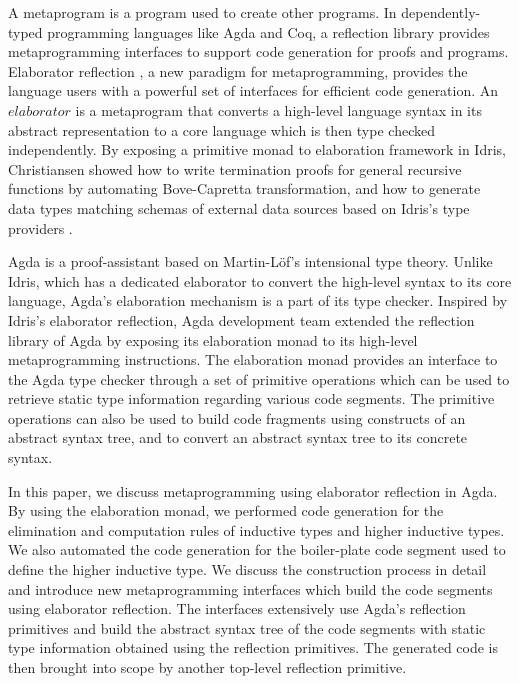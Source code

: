 \documentclass[sigplan,10pt]{acmart}
\begin{document}
A metaprogram is a program used to create other programs. In dependently-typed programming languages like Agda and Coq, a reflection library provides metaprogramming interfaces to support code generation for proofs and programs. Elaborator reflection \cite{David-2016}, a new paradigm for metaprogramming, provides the language users with a powerful set of interfaces for efficient code generation. An $elaborator$ is a metaprogram that converts a high-level language syntax in its abstract representation to a core language which is then type checked independently. By exposing a primitive monad to elaboration framework in Idris, Christiansen \cite{David-2016} showed how to write termination proofs for general recursive functions by automating Bove-Capretta \cite{Bove-2005} transformation, and how to generate data types matching schemas of external data sources based on Idris’s type providers \cite{David-2013}.

Agda is a proof-assistant based on Martin-Löf’s intensional type theory. Unlike Idris, which has a dedicated elaborator to convert the high-level syntax to its core language, Agda’s elaboration mechanism is a part of its type checker. Inspired by Idris’s elaborator reflection, Agda development team extended the reflection library of Agda by exposing its elaboration monad to its high-level metaprogramming instructions. The elaboration monad provides an interface to the Agda type checker through a set of primitive operations which can be used to retrieve static type information regarding various code segments. The primitive operations can also be used to build code fragments using constructs of an abstract syntax tree, and to convert an abstract syntax tree to its concrete syntax.

In this paper, we discuss metaprogramming using elaborator reflection in Agda. By using the elaboration monad, we performed code generation for the elimination and computation rules of inductive types and higher inductive types. We also automated the code generation for the boiler-plate code segment used to define the higher inductive type. We discuss the construction process in detail and introduce new metaprogramming interfaces which build the code segments using elaborator reflection. The interfaces extensively use Agda’s reflection primitives and build the abstract syntax tree of the code segments with static type information obtained using the reflection primitives. The generated code is then brought into scope by another top-level reflection primitive.
\end{document}
